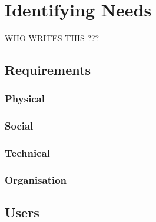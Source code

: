 \section{Identifying Needs}WHO WRITES THIS ???\\
\subsection{Requirements}

\subsubsection{Physical}

\subsubsection{Social}

\subsubsection{Technical}

\subsubsection{Organisation}

\subsection{Users}